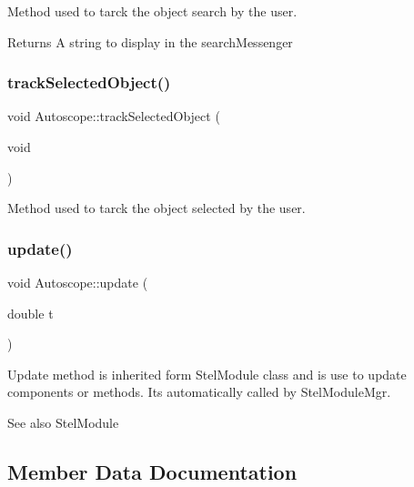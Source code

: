 Method used to tarck the object search by the user. 

\begin{DoxyReturn}{Returns}
A string to display in the search\+Messenger 
\end{DoxyReturn}
\mbox{\label{class_autoscope_a5782dc8cf3afeb9710240fdc98d0caa1}} 
\subsubsection{\texorpdfstring{trackSelectedObject()}{trackSelectedObject()}}
{\footnotesize\ttfamily void Autoscope\+::track\+Selected\+Object (\begin{DoxyParamCaption}\item[{void}]{ }\end{DoxyParamCaption})}



Method used to tarck the object selected by the user. 

\mbox{\label{class_autoscope_a3def05ed6ebac1d2f0245c96c1719d0a}} 
\subsubsection{\texorpdfstring{update()}{update()}}
{\footnotesize\ttfamily void Autoscope\+::update (\begin{DoxyParamCaption}\item[{double}]{t }\end{DoxyParamCaption})\hspace{0.3cm}{\ttfamily [virtual]}}



Update method is inherited form Stel\+Module class and is use to update components or methods. It\textquotesingle{}s automatically called by Stel\+Module\+Mgr. 

\begin{DoxySeeAlso}{See also}
Stel\+Module 
\end{DoxySeeAlso}


\subsection{Member Data Documentation}
\mbox{\label{class_autoscope_a6a17eb00225f765623844eaa9f80e71e}} 
